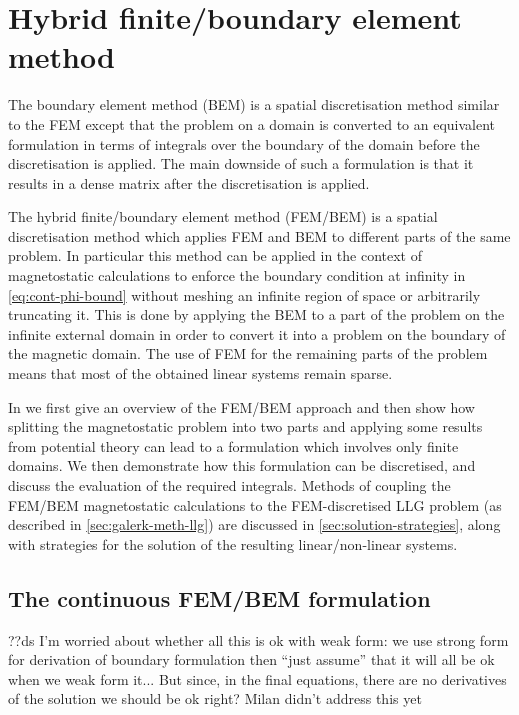 \newcommand{\bmop}{\mathcal{G}}

\chapter{Hybrid finite/boundary element method}
\label{sec:hybr-finit-elem}

The boundary element method (BEM) is a spatial discretisation method similar to the FEM except that the problem on a domain is converted to an equivalent formulation in terms of integrals over the boundary of the domain before the discretisation is applied.
The main downside of such a formulation is that it results in a dense matrix after the discretisation is applied.

The hybrid finite/boundary element method (FEM/BEM) is a spatial discretisation method which applies FEM and BEM to different parts of the same problem.
In particular this method can be applied in the context of magnetostatic calculations to enforce the boundary condition at infinity in \cref{eq:cont-phi-bound} without meshing an infinite region of space or arbitrarily truncating it.
This is done by applying the BEM to a part of the problem on the infinite external domain in order to convert it into a problem on the boundary of the magnetic domain.
The use of FEM for the remaining parts of the problem means that most of the obtained linear systems remain sparse.

In  we first give an overview of the FEM/BEM approach and then show how splitting the magnetostatic problem into two parts and applying some results from potential theory can lead to a formulation which involves only finite domains.
We then demonstrate how this formulation can be discretised, and discuss the evaluation of the required integrals.
Methods of coupling the FEM/BEM magnetostatic calculations to the FEM-discretised LLG problem (as described in \cref{sec:galerk-meth-llg}) are discussed in \cref{sec:solution-strategies}, along with strategies for the solution of the resulting linear/non-linear systems.


\section{The continuous FEM/BEM formulation}
\label{sec:bem-derivation}


??ds I'm worried about whether all this is ok with weak form: we use strong form for derivation of boundary formulation then ``just assume'' that it will all be ok when we weak form it...
But since, in the final equations, there are no derivatives of the solution we should be ok right?
Milan didn't address this yet


